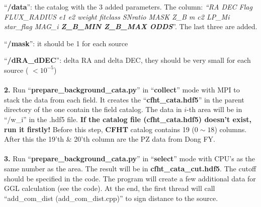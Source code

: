 \documentclass[12pt, a4paper]{article}
\begin{document}
\noindent``\textbf{/data}'': the catalog with the 3 added parameters. The column: \emph{``RA  DEC  Flag  FLUX\_RADIUS  e1  e2  weight  fitclass   SNratio  MASK  Z\_B  m  c2  LP\_Mi  star\_flag  MAG\_i  \textbf{Z\_B\_MIN  Z\_B\_MAX  ODDS}}''. The last three are added.

\noindent``\textbf{/mask}'': it should be 1 for each source

\noindent``\textbf{/dRA\_dDEC}'': delta RA and delta DEC, they should be very small for each source ( $< 10^{-5}$)
\\ \hspace*{\fill} \\

\noindent\textbf{2.} Run ``\textbf{prepare\_background\_cata.py}'' in ``\textbf{collect}'' mode with MPI to stack the data from each field. It creates the ``\textbf{cfht\_cata.hdf5}'' in the parent directory of the one contain the field catalog. The data in $i$-th area will be in ``/w\_i'' in the .hdf5 file. \textbf{If the catalog file (cfht\_cata.hdf5) doesn't exist, run it firstly!} Before this step, \textbf{CFHT} catalog contains 19 ($0\sim 18$) columns. After this the 19'th \& 20'th column are the PZ data from Dong FY.
\\ \hspace*{\fill} \\

\noindent\textbf{3.} Run ``\textbf{prepare\_background\_cata.py}'' in ``\textbf{select}'' mode with CPU's as the same number as the area. The result will be in \textbf{cfht\_cata\_cut.hdf5}. The cutoff should be specified in the code. The program will create a few additional data for GGL calculation (see the code). At the end, the first thread will call ``add\_com\_dist (add\_com\_dist.cpp)'' to sign distance to the source.
\end{document}
